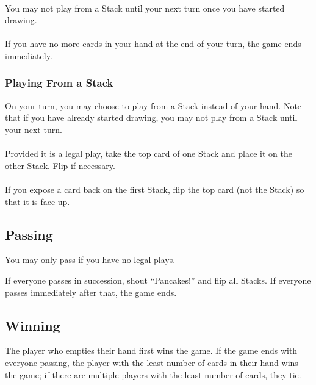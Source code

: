 \documentclass{article}
\begin{document}
\paragraph{}
You may not play from a Stack until your next turn once you have started drawing.

\paragraph{}
If you have no more cards in your hand at the end of your turn, the game ends immediately.

\subsubsection{Playing From a Stack}
\label{sec:fromstack}

On your turn, you may choose to play from a Stack instead of your hand. Note that if you have already started drawing, you may not play from a Stack until your next turn.

\paragraph{}
Provided it is a legal play, take the top card of one Stack and place it on the other Stack. Flip if necessary.

\paragraph{}
If you expose a card back on the first Stack, flip the top card (not the Stack) so that it is face-up.

\subsection{Passing}

You may only pass if you have no legal plays.

If everyone passes in succession, shout ``Pancakes!'' and flip all Stacks. If everyone passes immediately after that, the game ends.

\subsection{Winning}

The player who empties their hand first wins the game. If the game ends with everyone passing, the player with the least number of cards in their hand wins the game; if there are multiple players with the least number of cards, they tie.
\end{document}
